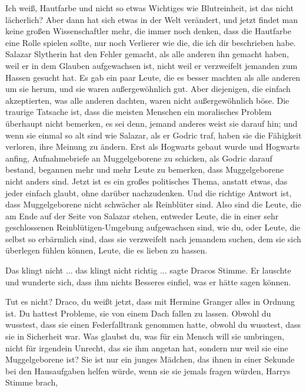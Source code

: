 \glqq Ich weiß, Hautfarbe und nicht so etwas Wichtiges wie Blutreinheit, ist das
nicht lächerlich? Aber dann hat sich etwas in der Welt verändert, und jetzt
findet man keine großen Wissenschaftler mehr, die immer noch denken, dass die
Hautfarbe eine Rolle spielen sollte, nur noch Verlierer wie die, die ich dir
beschrieben habe. Salazar Slytherin hat den Fehler gemacht, als alle anderen ihn
gemacht haben, weil er in dem Glauben aufgewachsen ist, nicht weil er
verzweifelt jemanden zum Hassen gesucht hat. Es gab ein paar Leute, die es
besser machten als alle anderen um sie herum, und sie waren außergewöhnlich gut.
Aber diejenigen, die einfach akzeptierten, was alle anderen dachten, waren nicht
außergewöhnlich böse. Die traurige Tatsache ist, dass die meisten Menschen ein
moralisches Problem überhaupt nicht bemerken, es sei denn, jemand anderes weist
sie darauf hin; und wenn sie einmal so alt sind wie Salazar, als er Godric traf,
haben sie die Fähigkeit verloren, ihre Meinung zu ändern. Erst als Hogwarts
gebaut wurde und Hogwarts anfing, Aufnahmebriefe an Muggelgeborene zu schicken,
als Godric darauf bestand, begannen mehr und mehr Leute zu bemerken, dass
Muggelgeborene nicht anders sind. Jetzt ist es ein großes politisches Thema,
anstatt etwas, das jeder einfach glaubt, ohne darüber nachzudenken. Und die
richtige Antwort ist, dass Muggelgeborene nicht schwächer als Reinblüter sind.
Also sind die Leute, die am Ende auf der Seite von Salazar stehen, entweder
Leute, die in einer sehr geschlossenen Reinblütigen-Umgebung aufgewachsen sind,
wie du, oder Leute, die selbst so erbärmlich sind, dass sie verzweifelt nach
jemandem suchen, dem sie sich überlegen fühlen können, Leute, die es lieben zu
hassen.\grqq{}

\glqq Das klingt nicht ... das klingt nicht richtig ...\grqq{} sagte Dracos
Stimme. Er lauschte und wunderte sich, dass ihm nichts Besseres einfiel, was er
hätte sagen können.

\glqq Tut es nicht? Draco, du weißt jetzt, dass mit Hermine Granger alles in
Ordnung ist. Du hattest Probleme, sie von einem Dach fallen zu lassen. Obwohl du
wusstest, dass sie einen Federfalltrank genommen hatte, obwohl du wusstest, dass
sie in Sicherheit war. Was glaubst du, was für ein Mensch will sie umbringen,
nicht für irgendein Unrecht, das sie ihm angetan hat, sondern nur weil sie eine
Muggelgeborene ist? Sie ist nur ein junges Mädchen, das ihnen in einer Sekunde
bei den Hausaufgaben helfen würde, wenn sie sie jemals fragen würden\grqq{},
Harrys Stimme brach,

